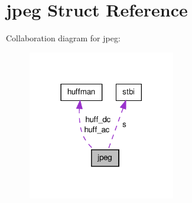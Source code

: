 \hypertarget{structjpeg}{\section{jpeg Struct Reference}
\label{structjpeg}
}


Collaboration diagram for jpeg\-:\nopagebreak
\begin{figure}[H]
\begin{center}
\leavevmode
\includegraphics[width=182pt]{structjpeg__coll__graph}
\end{center}
\end{figure}

